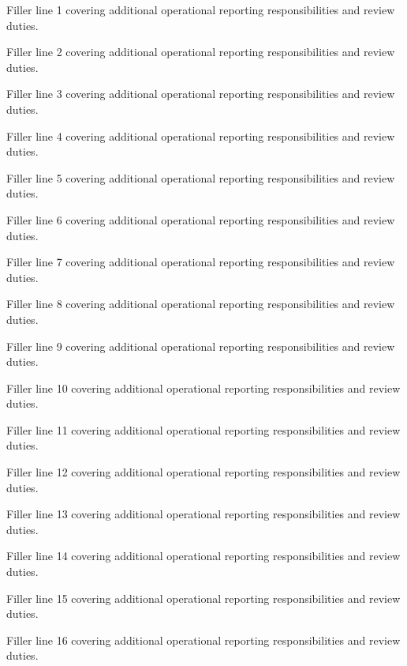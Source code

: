 \documentclass[fontsize=11pt, margin=narrow, medium=print]{careerdossier-cv}
\begin{document}
\MakeCDossierHeader

\begin{CDossierEntry}[title = {Modernization Program}, organization = {Continental Reliability Consortium}, location = {Ottawa, ON}, dates = {2019--Present}]
  \begin{CDossierItemize}
    \item Filler line 1 covering additional operational reporting responsibilities and review duties.
    \item Filler line 2 covering additional operational reporting responsibilities and review duties.
    \item Filler line 3 covering additional operational reporting responsibilities and review duties.
    \item Filler line 4 covering additional operational reporting responsibilities and review duties.
    \item Filler line 5 covering additional operational reporting responsibilities and review duties.
    \item Filler line 6 covering additional operational reporting responsibilities and review duties.
    \item Filler line 7 covering additional operational reporting responsibilities and review duties.
    \item Filler line 8 covering additional operational reporting responsibilities and review duties.
    \item Filler line 9 covering additional operational reporting responsibilities and review duties.
    \item Filler line 10 covering additional operational reporting responsibilities and review duties.
    \item Filler line 11 covering additional operational reporting responsibilities and review duties.
    \item Filler line 12 covering additional operational reporting responsibilities and review duties.
    \item Filler line 13 covering additional operational reporting responsibilities and review duties.
    \item Filler line 14 covering additional operational reporting responsibilities and review duties.
    \item Filler line 15 covering additional operational reporting responsibilities and review duties.
    \item Filler line 16 covering additional operational reporting responsibilities and review duties.

\end{CDossierItemize}
\end{CDossierEntry}
\end{document}
